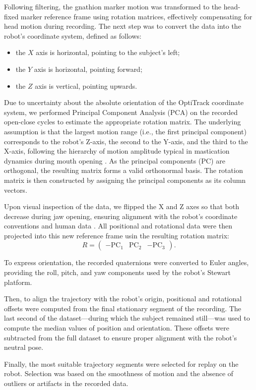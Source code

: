 Following filtering, the gnathion marker motion was transformed to the head-fixed marker reference frame using rotation matrices, effectively compensating 
for head motion during recording. The next step was to convert the data into the robot's coordinate system, defined as follows:
\begin{itemize}[nosep]
    \item the $X$ axis is horizontal, pointing to the subject's left;
    \item the $Y$ axis is horizontal, pointing forward;
    \item the $Z$ axis is vertical, pointing upwards.
\end{itemize}
Due to uncertainty about the absolute orientation of the OptiTrack coordinate system, we performed Principal Component Analysis (PCA) on the recorded open-close 
cycles to estimate the appropriate rotation matrix. The underlying assumption is that the largest motion range (i.e., the first principal component)
corresponds to the robot's Z-axis, the second to the Y-axis, and the third to the X-axis, following the hierarchy of motion amplitude typical in mastication 
dynamics during mouth opening \cite{mouth_opening_mvt}. As the principal components (PC) are orthogonal, the resulting matrix forms a valid orthonormal basis. The rotation matrix is 
then constructed by assigning the principal components as its column vectors.

Upon visual inspection of the data, we flipped the X and Z axes so that both decrease during jaw opening, ensuring alignment with the robot's coordinate 
conventions and human data \cite{chewing_traj}. All positional and rotational data were then projected into this new reference frame usin the resulting rotation matrix:
\[
R = \begin{pmatrix}
    -\text{PC}_1 & \text{PC}_2 & -\text{PC}_3
\end{pmatrix}.
\]

To express orientation, the recorded quaternions were converted to Euler angles, providing the roll, pitch, and yaw components used by the robot's 
Stewart platform.

Then, to align the trajectory with the robot's origin, positional and rotational offsets were computed from the final stationary segment of the 
recording. The last second of the dataset—during which the subject remained still—was used to compute the median values of position and orientation. 
These offsets were subtracted from the full dataset to ensure proper alignment with the robot's neutral pose.

Finally, the most suitable trajectory segments were selected for replay on the robot. Selection was based on the 
smoothness of motion and the absence of outliers or artifacts in the recorded data.






